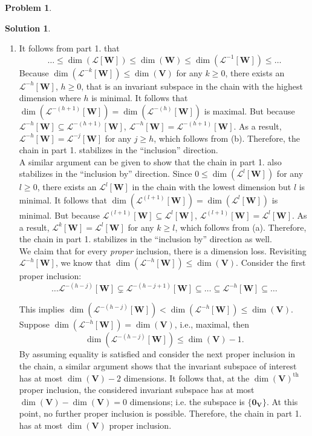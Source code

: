 \documentclass{article}
\theoremstyle{definition}
\newtheorem*{prob*}{Problem}
\newtheorem*{sln*}{Solution}
\newcommand{\V}{\mathbf{V}}
\newcommand{\W}{\mathbf{W}}
\newcommand{\lag}{\mathcal{L}}
\begin{document}
\begin{prob*}
\begin{sln*}
\begin{enumerate}
\begin{enumerate}
				

				\item It follows from part 1. that $$ \dots \leq \dim(\lag[\W]) \leq \dim(\W) \leq \dim(\lag^{-1}[\W]) \leq \dots  $$
				Because $\dim(\lag^{-k}[\W]) \leq \dim(\V)$ for any $k\geq 0$, there exists an $\lag^{-h}[\W]$, $h\geq 0$, that is an invariant subspace in the chain with the highest dimension where $h$ is minimal. It follows that $\dim(\lag^{-(h+1)}[\W]) = \dim(\lag^{-(h)}[\W])$ is maximal. But because $\lag^{-h}[\W] \subseteq \lag^{-(h+1)}[\W]$, $\lag^{-h}[\W] = \lag^{-(h+1)}[\W]$. As a result, $\lag^{-h}[\W] = \lag^{-j}[\W]$ for any $j\geq h$, which follows from (b). Therefore, the chain in part 1. stabilizes in the ``inclusion'' direction.  \\
				
				A similar argument can be given to show that the chain in part 1. also stabilizes in the ``inclusion by'' direction. Since $0 \leq \dim(\lag^{l}[\W])$ for any $l\geq 0$, there exists an $\lag^l[\W]$ in the chain with the lowest dimension but $l$ is minimal. It follows that $\dim(\lag^{(l+1)}[\W]) = \dim(\lag^{l}[\W])$ is minimal. But because $\lag^{(l+1)}[\W] \subseteq \lag^{l}[\W]$, $\lag^{(l+1)}[\W] = \lag^{l}[\W]$. As a result, $\lag^{k}[\W] = \lag^{l}[\W]$ for any $k\geq l$, which follows from (a). Therefore, the chain in part 1. stabilizes in the ``inclusion by'' direction as well.\\
				
				We claim that for every \textit{proper} inclusion, there is a dimension loss. Revisiting $\lag^{-h}[\W]$, we know that $\dim(\lag^{-h}[\W]) \leq \dim(\V)$. Consider the first proper inclusion: $$\dots \lag^{-(h-j)}[\W] \subsetneq \lag^{-(h-j+1)}[\W] \subseteq \dots \subseteq \lag^{-h}[\W]\subseteq \dots$$ 
				
				This implies $\dim(\lag^{-(h-j)}[\W]) < \dim(\lag^{-h}[\W]) \leq \dim(\V)$. Suppose $\dim(\lag^{-h}[\W]) = \dim(\V)$, i.e., maximal, then $$\dim(\lag^{-(h-j)}[\W]) \leq \dim(\V) - 1.$$ By assuming equality is satisfied and consider the next proper inclusion in the chain, a similar argument shows that the invariant subspace of interest has at most $\dim(\V) - 2$ dimensions. It follows that, at the $\dim(\V)^{\text{th}}$ proper inclusion, the considered invariant subspace has at most $\dim(\V) - \dim(\V) = 0$ dimensions; i.e. the subspace is $\{\mathbf{0}_\V\}$. At this point, no further proper inclusion is possible. Therefore, the chain in part 1. has at most $\dim(\V)$ proper inclusion.\\
			\end{enumerate}
				

\end{enumerate}
\end{sln*}
\end{prob*}
\end{document}
